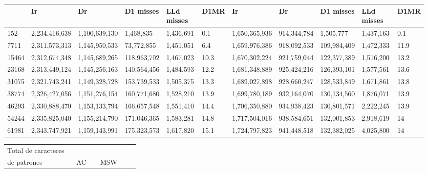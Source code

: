 {\begin{table}[H]
\begin{center}
{\begin{tabular}{lllllllllll}
 & Ir & Dr & D1 misses & LLd misses  & D1MR  
 & Ir & Dr & D1 misses & LLd misses & D1MR  \\
  \midrule
152&2,234,416,638&1,100,639,130&1,468,835&1,436,691&	0.1	&1,650,365,936&914,344,784&1,505,777&1,437,163&	0.1\\
7711&2,311,573,313&1,145,950,533&73,772,855&1,451,051&	6.4	&1,659,976,386&918,092,533&109,984,409&1,472,333&	11.9\\
15464&2,312,674,348&1,145,689,265&118,963,702&1,467,023&	10.3	&1,670,302,224&921,759,044&122,377,389&1,516,200&	13.2\\
23168&2,313,449,124&1,145,256,163&140,564,456&1,484,593&	12.2	&1,681,348,889&925,424,216&126,393,101&1,577,561&	13.6\\
31075&2,321,743,241&1,149,328,728&153,739,533&1,505,375&	13.3	&1,689,027,898&928,660,247&128,533,849&1,671,861&	13.8\\
38774&2,326,427,056&1,151,276,154&160,771,680&1,528,210&	13.9	&1,699,780,189&932,164,070&130,134,560&1,876,071&	13.9\\
46293&2,330,888,470&1,153,133,794&166,657,548&1,551,410&	14.4	&1,706,350,880&934,938,423&130,801,571&2,222,245&	13.9\\
54244&2,335,825,040&1,155,214,790&171,046,365&1,583,281&	14.8	&1,717,504,016&938,584,651&132,001,853&2,918,619&	14\\
61981&2,343,747,921&1,159,143,991&175,323,573&1,617,820&	15.1	&1,724,797,823&941,448,518&132,382,025&4,025,800&	14\\
  \bottomrule
\end{tabular} }
 \label{tab:Prueba1Cache} 
\end{center}
\end{table}

\begin{table}[H]
\begin{center}
\scalebox{0.5} {
\begin{tabular}{lllllllllll}
\hline
  Total de caracteres\\ de patrones & \multicolumn{4}{c}{AC} & \multicolumn{4}{c}{MSW}\\


\end{tabular}}
\end{center}
\end{table}}
